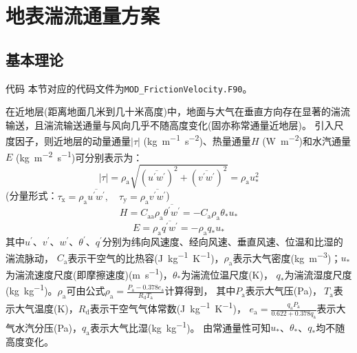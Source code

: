 \chapter{地表湍流通量方案}\label{ch:地表湍流通量}

\section{基本理论}\label{基本理论}
\begin{mymdframed}{代码}
  本节对应的代码文件为\texttt{MOD\_FrictionVelocity.F90}。
\end{mymdframed}

在近地层(距离地面几米到几十米高度)中，地面与大气在垂直方向存在显著的湍流输送，且湍流输送通量与风向几乎不随高度变化(固亦称常通量近地层)。
引入尺度因子，则近地层的动量通量$\left|\tau\right|$ (\unit{kg.m^{-1}.s^{-2}})、热量通量$H$ (\unit{W.m^{-2}})和水汽通量$E$ (\unit{kg.m^{-2}.s^{-1}})可分别表示为：
\begin{equation}
  |\tau|=\rho_{\mathrm{a}} \sqrt{ \left(\overline{u^{\prime} w^{\prime}}\right)^{2} + \left(\overline{v^{\prime} w^{\prime}}\right)^{2} }=\rho_{\mathrm{a}} u_{*}^{2}
\end{equation}
(分量形式：$\tau_{\mathrm{x}}=\rho_{\mathrm{a}} \overline{u^{\prime} w^{\prime}}, \quad \tau_{\mathrm{y}}=\rho_{\mathrm{a}} \overline{v^{\prime} w^{\prime}}$)
\begin{equation}
  H=C_{\mathrm{a a}} \rho_{\mathrm{a}} \overline{\theta^{\prime} w^{\prime}}=-C_{\mathrm{a}} \rho_{\mathrm{a}} \theta_{\mathrm{*}} u_{*}
\end{equation}
\begin{equation}
  E=\rho_{\mathrm{a}} \overline{q^{\prime} w^{\prime}}=-\rho_{\mathrm{a}} q_{*} u_{*}
\end{equation}
其中$u^\prime$、$v^\prime$、$w^\prime$、$\theta^\prime$、$q^\prime$分别为纬向风速度、经向风速、垂直风速、位温和比湿的湍流脉动，
$C_{\mathrm{a}}$表示干空气的比热容(\unit{J.kg^{-1}.K^{-1}})，$\rho_{\mathrm{a}}$表示大气密度(\unit{kg.m^{-3}})；$u_\ast$为湍流速度尺度(即摩擦速度)(\unit{m.s^{-1}})，$\theta_\ast$为湍流位温尺度(K)，
$q_\ast$为湍流湿度尺度(\unit{kg.kg^{-1}})。$\rho_{\mathrm{a}}$可由公式$\rho_{\mathrm{a}}=\frac{P_{\mathrm{a}}-0.378e_{\mathrm{a}}}{R_{\mathrm{d}}T_{\mathrm{a}}}$计算得到，
其中$P_{\mathrm{a}}$表示大气压(Pa)，$\ T_{\mathrm{a}}$表示大气温度(K)，$R_{\mathrm{d}}$表示干空气气体常数(\unit{J.kg^{-1}.K^{-1}})，
$e_{\mathrm{a}}=\frac{q_{\mathrm{a}}P_{\mathrm{a}}}{0.622+0.378q_{\mathrm{a}}}$表示大气水汽分压(Pa)，$q_{\mathrm{a}}$表示大气比湿(\unit{kg.kg^{-1}})。
由常通量性可知$u_\ast$、$\theta_\ast$、$q_\ast$均不随高度变化。


